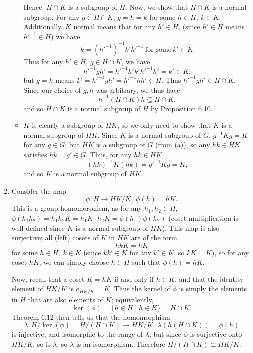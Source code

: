 \documentclass{homework}
\begin{document}
\begin{solution}
\begin{enumerate}[label=(\alph*)]
\begin{itemize}
          Hence, $H\cap K$ is a subgroup of $H$. Now, we show that $H\cap K$ is a normal subgroup.
          For any $g\in H\cap K$, $g=h=k$ for some $h\in H,\ k\in K$. Additionally, $K$ normal means
          that for any $h'\in H$, (since $h'\in H$ means $h'^{-1}\in H$) we have \[
            k=(h'^{-1})^{-1}k'h'^{-1}~\text{for some}~k'\in K
          .\] Thus for any $h'\in H$, $g\in H\cap K$, we have \[
            h'^{-1}gh'=h'^{-1}h'k'h'^{-1}h'=k'\in K
          ;\] but $g=h$ means $k'=h'^{-1}gh'=h'^{-1}hh'\in H$. Thus $h'^{-1}gh'\in H\cap K$. Since
          our choice of $g,h$ was arbitrary, we thus have \[
            h^{-1}(H\cap K)h\subseteq H\cap K
          ,\] and so $H\cap K$ is a normal subgroup of $H$ by Proposition 6.10.

        \item $K$ is clearly a subgroup of $HK$, so we only need to show that $K$ is a normal
          subgroup of $HK$. Since $K$ is a normal subgroup of $G$, $g^{-1}Kg=K$ for any $g\in G$;
          but $HK$ is a subgroup of $G$ (from (a)), so any $hk\in HK$ satisfies $hk=g'\in G$. Thus,
          for any $hk\in HK$, \[
            (hk)^{-1}K(hk)=g'^{-1}Kg=K
          ,\] and so $K$ is a normal subgroup of $HK$.
      \end{itemize}

    \item Consider the map \[
        \phi: H\longrightarrow HK / K,\ \phi(h)=hK
        .\] This is a group homomorphism, as for any $h_1,h_2\in H$, $\phi(h_1h_2)=h_1h_2K=h_1K\cdot
        h_2K=\phi(h_1)\phi(h_2)$ (coset multiplication is well-defined since $K$ is a normal
        subgroup of $HK$). This map is also surjective; all (left) cosets of $K$ in $HK$ are of the
        form \[
        hkK=hK
      \] for some $h\in H,\ k\in K$ (since $kk'\in K$ for any $k'\in K$, so $kK=K$), so for any
      coset $hK$, we can simply choose $h\in H$ such that $\phi(h)=hK$.

      Now, recall that a coset $K=hK$ if and only if $h\in K$, and that the identity element of $HK
      / K$ is $e_{HK / K}=K$. Thus the kernel of $\phi$ is simply the elements in $H$ that are also
      elements of $K$; equivalently, \[
        \ker{(\phi)}=\{ h\in H\mid h\in K \}=H\cap K
      .\] Theorem 6.12 then tells us that the homomorphism \[
        \lambda: H / \ker{(\phi)}=H / (H\cap K)\longrightarrow HK / K,\ \lambda(h(H\cap K))=\phi(h)
      \] is injective, and isomorphic to the range of $\lambda$; but since $\phi$ is surjective onto
      $HK / K$, so is $\lambda$, so $\lambda$ is an isomorphism. Therefore $H / (H\cap K)\cong HK /
      K$.


\end{enumerate}
\end{solution}
\end{document}
